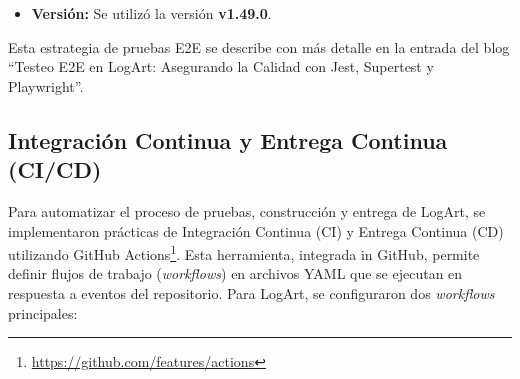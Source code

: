 \begin{itemize}
\begin{itemize}
                Las pruebas se ejecutaron principalmente contra el motor Chromium, como se especifica en el workflow de CI. Los informes generados por Playwright fueron clave para identificar y depurar muchos de los problemas en la interfaz.
                \item \textbf{Versión:} Se utilizó la versión \textbf{v1.49.0}.
            \end{itemize}
            Esta estrategia de pruebas E2E se describe con más detalle en la entrada del blog ``Testeo  E2E en LogArt: Asegurando la Calidad con Jest, Supertest y Playwright''\cite{MorenoTesteoLogArt}.
    \end{itemize}
    
\subsection{Integración Continua y Entrega Continua (CI/CD)}
\label{sec:cicd}

Para automatizar el proceso de pruebas, construcción y entrega de LogArt, se implementaron prácticas de Integración Continua (CI) y Entrega Continua (CD) utilizando GitHub Actions\footnote{\url{https://github.com/features/actions}}. Esta herramienta, integrada in GitHub, permite definir flujos de trabajo (\textit{workflows}) en archivos YAML que se ejecutan en respuesta a eventos del repositorio. Para LogArt, se configuraron dos \textit{workflows} principales:

